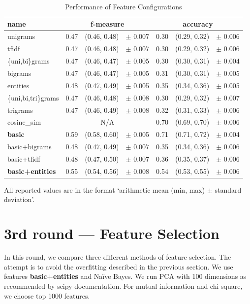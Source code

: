 \begin{table}[h!]

\centering
\begin{tabular}{lr@{~}r@{~}rr@{~}r@{~}r}
\toprule
\textbf{name}	& \multicolumn{3}{c}{\textbf{f-measure}} & \multicolumn{3}{c}{\textbf{accuracy}} \\
\midrule
unigrams& 0.47 & (0.46, 0.48) & $\pm$ 0.007 & 0.30 & (0.29, 0.32) & $\pm$ 0.006 \\
tfidf& 0.47 & (0.46, 0.48) & $\pm$ 0.007 & 0.30 & (0.29, 0.32) & $\pm$ 0.006 \\
\{uni,bi\}grams	& 0.47 & (0.46, 0.47) & $\pm$ 0.005 & 0.30 & (0.30, 0.31) & $\pm$ 0.004\\
bigrams & 0.47 & (0.46, 0.47) & $\pm$ 0.005 & 0.31 & (0.30, 0.31) & $\pm$ 0.005			\\
entities & 0.48 & (0.47, 0.49) & $\pm$ 0.005 & 0.35 & (0.34, 0.36) & $\pm$ 0.005		\\
\{uni,bi,tri\}grams & 0.47 & (0.46, 0.48) & $\pm$ 0.008 & 0.30 & (0.29, 0.32) & $\pm$ 0.007	\\
trigrams & 0.47 & (0.46, 0.49) & $\pm$ 0.008 & 0.32 & (0.31, 0.33) & $\pm$ 0.006		\\
cosine\_sim & \multicolumn{3}{c}{N/A} & 0.70 & (0.69, 0.70) & $\pm$ 0.006		\\
\textbf{basic} & 0.59 & (0.58, 0.60) & $\pm$ 0.005 & 0.71 & (0.71, 0.72) & $\pm$ 0.004		\\
basic+bigrams & 0.48 & (0.47, 0.49) & $\pm$ 0.007 & 0.35 & (0.34, 0.36) & $\pm$ 0.006		\\
basic+tfidf & 0.48 & (0.47, 0.50) & $\pm$ 0.007 & 0.36 & (0.35, 0.37) & $\pm$ 0.006			\\
\textbf{basic+entities} & 0.55 & (0.54, 0.56) & $\pm$ 0.008 & 0.54 & (0.53, 0.55) & $\pm$ 0.006		\\
\bottomrule
\end{tabular}


\caption{Performance of Feature Configurations}\label{tab:feat_perf}
All reported values are in the format `arithmetic mean (min, max) $\pm$ standard deviation'.
\end{table}


\section{3rd round --- Feature Selection}

In this round, we compare three different methods of feature selection.
The attempt is to avoid the overfitting described in the previous section.
We use features \textbf{basic+entities} and Na\"{i}ve Bayes.
We run PCA with 100 dimensions as recommended by scipy documentation.
For mutual information and chi square, we choose top 1000 features.

